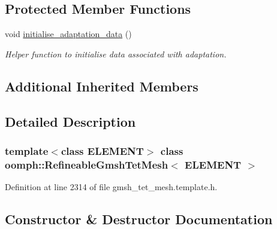 \subsection*{Protected Member Functions}
\begin{DoxyCompactItemize}
\item 
void \hyperlink{classoomph_1_1RefineableGmshTetMesh_aea1e1c26bb8772231ce5b2b8d915f764}{initialise\+\_\+adaptation\+\_\+data} ()
\begin{DoxyCompactList}\small\item\em Helper function to initialise data associated with adaptation. \end{DoxyCompactList}\end{DoxyCompactItemize}
\subsection*{Additional Inherited Members}


\subsection{Detailed Description}
\subsubsection*{template$<$class E\+L\+E\+M\+E\+NT$>$\newline
class oomph\+::\+Refineable\+Gmsh\+Tet\+Mesh$<$ E\+L\+E\+M\+E\+N\+T $>$}



Definition at line 2314 of file gmsh\+\_\+tet\+\_\+mesh.\+template.\+h.



\subsection{Constructor \& Destructor Documentation}
\mbox{\label{classoomph_1_1RefineableGmshTetMesh_ae7f3a8f3481168bdb8039f6355b50cf0}} 
